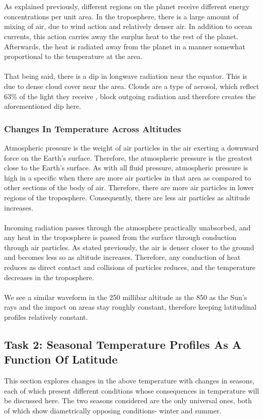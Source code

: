 \documentclass[hidelinks]{article}
\begin{document}
\\\\
As explained previously, different regions on the planet receive different energy concentrations per unit area. In the troposphere, there is a large amount of mixing of air, due to wind action and relatively denser air. In addition to ocean currents, this action carries away the surplus heat to the rest of the planet. Afterwards, the heat is radiated away from the planet in a manner somewhat proportional to the temperature at the area.
\\\\
That being said, there is a dip in longwave radiation near the equator. This is due to dense cloud cover near the area. Clouds are a type of aerosol, which reflect 63\% of the light they receive \cite{hatzianastassiou2007direct}, block outgoing radiation and therefore creates the aforementioned dip here.

\subsubsection{Changes In Temperature Across Altitudes}
Atmospheric pressure is the weight of air particles in the air exerting a downward force on the Earth's surface. Therefore, the atmospheric pressure is the greatest close to the Earth's surface. As with all fluid pressure, atmospheric pressure is high in a specific when there are more air particles in that area as compared to other sections of the body of air. Therefore, there are more air particles in lower regions of the troposphere. Consequently, there are less air particles as altitude increases.
\\\\
Incoming radiation passes through the atmosphere practically unabsorbed, and any heat in the troposphere is passed from the surface through conduction through air particles. As stated previously, the air is denser closer to the ground and becomes less so as altitude increases. Therefore, any conduction of heat reduces as direct contact and collisions of particles reduces, and the temperature decreases in the troposphere.  
\\\\
We see a similar waveform in the 250 millibar altitude as the 850 as the Sun's rays and the impact on areas stay roughly constant, therefore keeping latitudinal profiles relatively constant.

\subsection{Task 2: Seasonal Temperature Profiles As A Function Of Latitude}
This section explores changes in the above temperature with changes in seasons, each of which present different conditions whose consequences in temperature will be discussed here. The two seasons considered are the only universal ones, both of which show diametrically opposing conditions- winter and summer.
\end{document}
